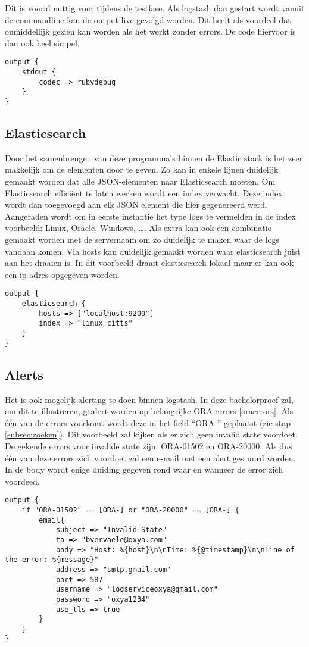 Dit is vooral nuttig voor tijdens  de testfase. Als logstash dan gestart wordt vanuit de commandline kan de output live gevolgd worden. Dit heeft als voordeel dat onmiddellijk gezien kan worden als het werkt zonder errors. De code hiervoor is dan ook heel simpel.

\lstset{escapechar=@,style=customc}  
\begin{lstlisting}[frame=single]  
output {
	stdout {
		codec => rubydebug 
	}
}
\end{lstlisting}

\subsection{Elasticsearch}
\label{subsec:elasticsearch}

Door het samenbrengen van deze programma’s binnen de Elastic stack is het zeer makkelijk om de elementen door te geven. Zo kan in enkele lijnen duidelijk gemaakt worden dat alle JSON-elementen naar Elasticsearch moeten. Om Elasticsearch efficiënt te laten werken wordt een index verwacht. Deze index wordt dan toegevoegd aan elk JSON element die hier gegenereerd werd. Aangeraden wordt om in eerste instantie het type logs te vermelden in de index voorbeeld: Linux, Oracle, Windows, \dots. Als extra kan ook een combinatie gemaakt worden met de servernaam om zo duidelijk te maken waar de logs vandaan komen. 
Via hosts kan duidelijk  gemaakt worden waar elasticsearch juist aan het draaien is. In dit voorbeeld draait elasticsearch lokaal maar er kan ook een ip adres opgegeven worden.

\lstset{escapechar=@,style=customc}  
\begin{lstlisting}[frame=single]  
output {
	elasticsearch {
		hosts => ["localhost:9200"]
		index => "linux_citts"
	}
}
\end{lstlisting}

\subsection{Alerts}
\label{subsec:alerts}

Het is ook mogelijk alerting te doen binnen logstash. In deze bachelorproef zal, om dit te illustreren, gealert worden op belangrijke  ORA-errors \autoref{oraerrors}. Als één van de errors voorkomt wordt deze in het field “ORA-” geplaatst (zie stap \ref{subsec:zoeken}). Dit voorbeeld zal kijken als er zich geen invalid state voordoet. De gekende errors voor invalide state zijn: ORA-01502 en ORA-20000. Als dus één van deze errors zich voordoet zal een e-mail met een alert gestuurd worden. In de body wordt enige duiding gegeven rond waar en wanneer de error zich voordeed.

\lstset{escapechar=@,style=customc}  
\begin{lstlisting}[frame=single]
output {
	if "ORA-01502" == [ORA-] or "ORA-20000" == [ORA-] {
		email{
			subject => "Invalid State"
			to => "bvervaele@oxya.com"
			body => "Host: %{host}\n\nTime: %{@timestamp}\n\nLine of the error: %{message}"
			address => "smtp.gmail.com"
			port => 587
			username => "logserviceoxya@gmail.com"
			password => "oxya1234"
			use_tls => true
		}
	}	 
}

\end{lstlisting}
